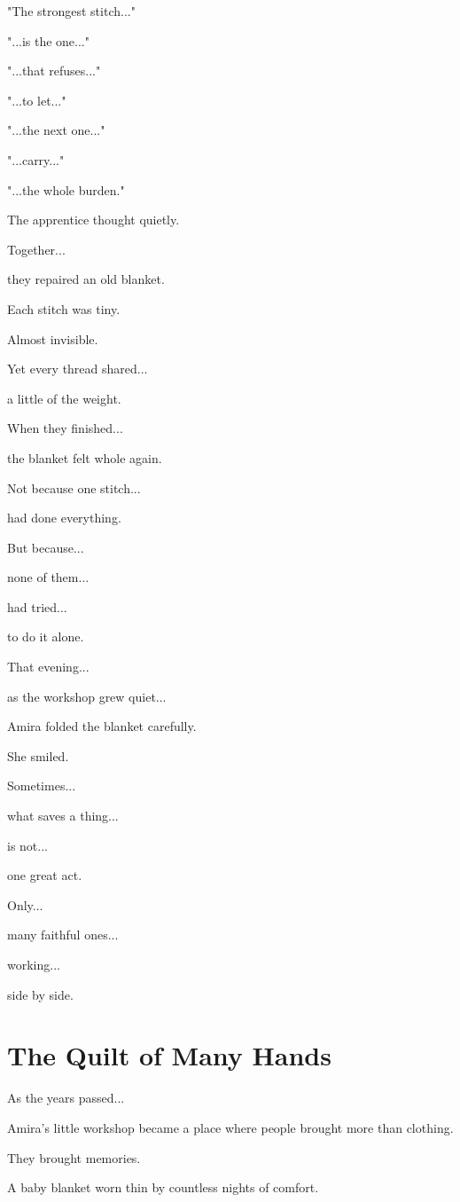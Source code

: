\documentclass[12pt,openany]{book}
\begin{document}
"The strongest stitch..."

"...is the one..."

"...that refuses..."

"...to let..."

"...the next one..."

"...carry..."

"...the whole burden."

The apprentice thought quietly.

Together...

they repaired an old blanket.

Each stitch was tiny.

Almost invisible.

Yet every thread shared...

a little of the weight.

When they finished...

the blanket felt whole again.

Not because one stitch...

had done everything.

But because...

none of them...

had tried...

to do it alone.

That evening...

as the workshop grew quiet...

Amira folded the blanket carefully.

She smiled.

Sometimes...

what saves a thing...

is not...

one great act.

Only...

many faithful ones...

working...

side by side.
\section*{The Quilt of Many Hands}

As the years passed...

Amira's little workshop became a place where people brought more than clothing.

They brought memories.

A baby blanket worn thin by countless nights of comfort.
\end{document}
